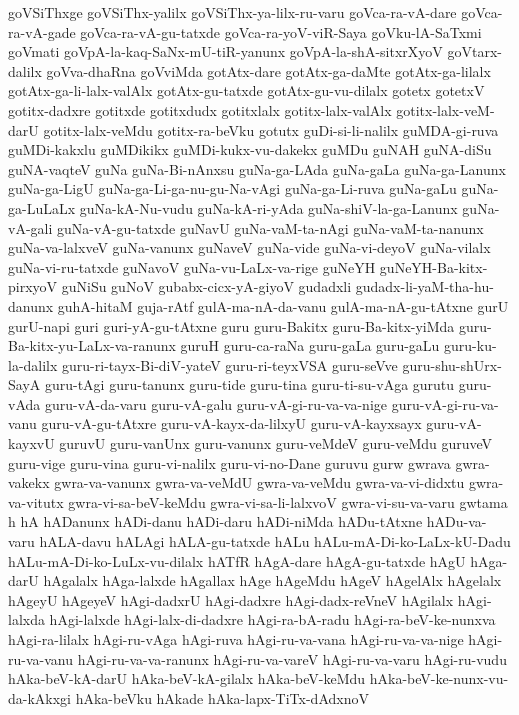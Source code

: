 {goVSiThxge
goVSiThx-yalilx
goVSiThx-ya-lilx-ru-varu
goVca-ra-vA-dare
goVca-ra-vA-gade
goVca-ra-vA-gu-tatxde
goVca-ra-yoV-viR-Saya
goVku-lA-SaTxmi
goVmati
goVpA-la-kaq-SaNx-mU-tiR-yanunx
goVpA-la-shA-sitxrXyoV
goVtarx-dalilx
goVva-dhaRna
goVviMda
gotAtx-dare
gotAtx-ga-daMte
gotAtx-ga-lilalx
gotAtx-ga-li-lalx-valAlx
gotAtx-gu-tatxde
gotAtx-gu-vu-dilalx
gotetx
gotetxV
gotitx-dadxre
gotitxde
gotitxdudx
gotitxlalx
gotitx-lalx-valAlx
gotitx-lalx-veM-darU
gotitx-lalx-veMdu
gotitx-ra-beVku
gotutx
guDi-si-li-nalilx
guMDA-gi-ruva
guMDi-kakxlu
guMDikikx
guMDi-kukx-vu-dakekx
guMDu
guNAH
guNA-diSu
guNA-vaqteV
guNa
guNa-Bi-nAnxsu
guNa-ga-LAda
guNa-gaLa
guNa-ga-Lanunx
guNa-ga-LigU
guNa-ga-Li-ga-nu-gu-Na-vAgi
guNa-ga-Li-ruva
guNa-gaLu
guNa-ga-LuLaLx
guNa-kA-Nu-vudu
guNa-kA-ri-yAda
guNa-shiV-la-ga-Lanunx
guNa-vA-gali
guNa-vA-gu-tatxde
guNavU
guNa-vaM-ta-nAgi
guNa-vaM-ta-nanunx
guNa-va-lalxveV
guNa-vanunx
guNaveV
guNa-vide
guNa-vi-deyoV
guNa-vilalx
guNa-vi-ru-tatxde
guNavoV
guNa-vu-LaLx-va-rige
guNeYH
guNeYH-Ba-kitx-pirxyoV
guNiSu
guNoV
gubabx-cicx-yA-giyoV
gudadxli
gudadx-li-yaM-tha-hu-danunx
guhA-hitaM
guja-rAtf
gulA-ma-nA-da-vanu
gulA-ma-nA-gu-tAtxne
gurU
gurU-napi
guri
guri-yA-gu-tAtxne
guru
guru-Bakitx
guru-Ba-kitx-yiMda
guru-Ba-kitx-yu-LaLx-va-ranunx
guruH
guru-ca-raNa
guru-gaLa
guru-gaLu
guru-ku-la-dalilx
guru-ri-tayx-Bi-diV-yateV
guru-ri-teyxVSA
guru-seVve
guru-shu-shUrx-SayA
guru-tAgi
guru-tanunx
guru-tide
guru-tina
guru-ti-su-vAga
gurutu
guru-vAda
guru-vA-da-varu
guru-vA-galu
guru-vA-gi-ru-va-va-nige
guru-vA-gi-ru-va-vanu
guru-vA-gu-tAtxre
guru-vA-kayx-da-lilxyU
guru-vA-kayxsayx
guru-vA-kayxvU
guruvU
guru-vanUnx
guru-vanunx
guru-veMdeV
guru-veMdu
guruveV
guru-vige
guru-vina
guru-vi-nalilx
guru-vi-no-Dane
guruvu
gurw
gwrava
gwra-vakekx
gwra-va-vanunx
gwra-va-veMdU
gwra-va-veMdu
gwra-va-vi-didxtu
gwra-va-vitutx
gwra-vi-sa-beV-keMdu
gwra-vi-sa-li-lalxvoV
gwra-vi-su-va-varu
gwtama
h
hA
hADanunx
hADi-danu
hADi-daru
hADi-niMda
hADu-tAtxne
hADu-va-varu
hALA-davu
hALAgi
hALA-gu-tatxde
hALu
hALu-mA-Di-ko-LaLx-kU-Dadu
hALu-mA-Di-ko-LuLx-vu-dilalx
hATfR
hAgA-dare
hAgA-gu-tatxde
hAgU
hAga-darU
hAgalalx
hAga-lalxde
hAgallax
hAge
hAgeMdu
hAgeV
hAgelAlx
hAgelalx
hAgeyU
hAgeyeV
hAgi-dadxrU
hAgi-dadxre
hAgi-dadx-reVneV
hAgilalx
hAgi-lalxda
hAgi-lalxde
hAgi-lalx-di-dadxre
hAgi-ra-bA-radu
hAgi-ra-beV-ke-nunxva
hAgi-ra-lilalx
hAgi-ru-vAga
hAgi-ruva
hAgi-ru-va-vana
hAgi-ru-va-va-nige
hAgi-ru-va-vanu
hAgi-ru-va-va-ranunx
hAgi-ru-va-vareV
hAgi-ru-va-varu
hAgi-ru-vudu
hAka-beV-kA-darU
hAka-beV-kA-gilalx
hAka-beV-keMdu
hAka-beV-ke-nunx-vu-da-kAkxgi
hAka-beVku
hAkade
hAka-lapx-TiTx-dAdxnoV
}
